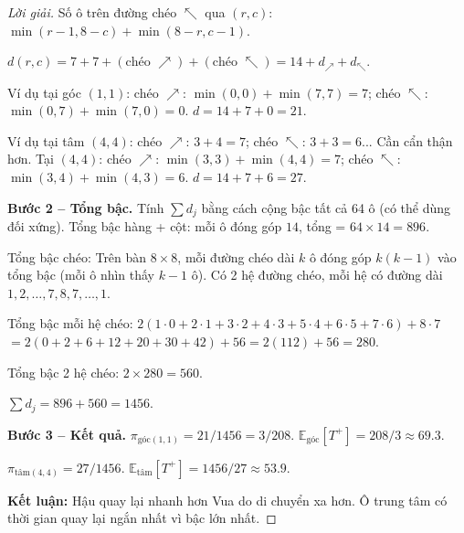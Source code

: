 \documentclass[8pt,a4paper]{article}
\newenvironment{solution}{\begin{proof}[Lời giải]}{\end{proof}}
\newcommand{\E}{\mathbb{E}}
\begin{document}
\begin{solution}
Số ô trên đường chéo $\nwarrow$ qua $(r,c)$: $\min(r-1, 8-c) + \min(8-r, c-1)$.

$d(r,c) = 7 + 7 + (\text{chéo } \nearrow) + (\text{chéo } \nwarrow) = 14 + d_{\nearrow} + d_{\nwarrow}$.

Ví dụ tại góc $(1,1)$: chéo $\nearrow$: $\min(0,0) + \min(7,7) = 7$; chéo $\nwarrow$: $\min(0,7) + \min(7,0) = 0$. $d = 14 + 7 + 0 = 21$.

Ví dụ tại tâm $(4,4)$: chéo $\nearrow$: $3+4=7$; chéo $\nwarrow$: $3+3=6$... Cần cẩn thận hơn. Tại $(4,4)$: chéo $\nearrow$: $\min(3,3) + \min(4,4) = 7$; chéo $\nwarrow$: $\min(3,4) + \min(4,3) = 6$. $d = 14+7+6 = 27$.

\textbf{Bước 2 -- Tổng bậc.}
Tính $\sum d_j$ bằng cách cộng bậc tất cả 64 ô (có thể dùng đối xứng). Tổng bậc hàng + cột: mỗi ô đóng góp $14$, tổng = $64 \times 14 = 896$.

Tổng bậc chéo: Trên bàn $8 \times 8$, mỗi đường chéo dài $k$ ô đóng góp $k(k-1)$ vào tổng bậc (mỗi ô nhìn thấy $k-1$ ô). Có 2 hệ đường chéo, mỗi hệ có đường dài $1, 2, \ldots, 7, 8, 7, \ldots, 1$.

Tổng bậc mỗi hệ chéo: $2(1\cdot 0 + 2\cdot 1 + 3\cdot 2 + 4\cdot 3 + 5\cdot 4 + 6\cdot 5 + 7\cdot 6) + 8\cdot 7$
$= 2(0+2+6+12+20+30+42) + 56 = 2(112) + 56 = 280$.

Tổng bậc 2 hệ chéo: $2 \times 280 = 560$.

$\sum d_j = 896 + 560 = 1456$.

\textbf{Bước 3 -- Kết quả.}
$\pi_{\text{góc}(1,1)} = 21/1456 = 3/208$. $\E_{\text{góc}}[T^+] = 208/3 \approx 69.3$.

$\pi_{\text{tâm}(4,4)} = 27/1456$. $\E_{\text{tâm}}[T^+] = 1456/27 \approx 53.9$.

\textbf{Kết luận:} Hậu quay lại nhanh hơn Vua do di chuyển xa hơn. Ô trung tâm có thời gian quay lại ngắn nhất vì bậc lớn nhất.
\end{solution}
\end{document}
